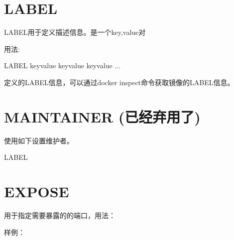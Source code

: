 \documentclass[letterpaper,10pt,english]{sphinxmanual}
\begin{document}
\section{LABEL}
\label{\detokenize{_u8fd0_u884c_u5e94_u7528/05-dockerfile_u53c2_u8003:label}}
LABEL用于定义描述信息。是一个key,value对

用法:

%
\begin{sphinxVerbatim}[commandchars=\\\{\}]
LABEL \PYGZlt{}key\PYGZgt{}\PYGZlt{}value\PYGZgt{} \PYGZlt{}key\PYGZgt{}\PYGZlt{}value\PYGZgt{} \PYGZlt{}key\PYGZgt{}\PYGZlt{}value\PYGZgt{} ...
\end{sphinxVerbatim}

定义的LABEL信息，可以通过docker inspect命令获取镜像的LABEL信息。


\section{MAINTAINER (已经弃用了)}
\label{\detokenize{_u8fd0_u884c_u5e94_u7528/05-dockerfile_u53c2_u8003:maintainer}}
使用如下设置维护者。

%
\begin{sphinxVerbatim}[commandchars=\\\{\}]
LABEL 
\end{sphinxVerbatim}


\section{EXPOSE}
\label{\detokenize{_u8fd0_u884c_u5e94_u7528/05-dockerfile_u53c2_u8003:expose}}
用于指定需要暴露的的端口，用法：

%
\begin{sphinxVerbatim}[commandchars=\\\{\}]
\end{sphinxVerbatim}

样例：

%
\begin{sphinxVerbatim}[commandchars=\\\{\}]
\end{sphinxVerbatim}
\end{document}
